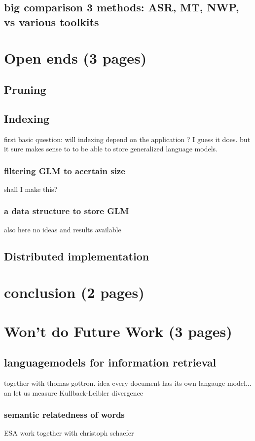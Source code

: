 \documentclass[•]{book}
\begin{document}
\section{big comparison 3 methods: ASR, MT, NWP, vs various toolkits}


\chapter{Open ends (3 pages)}
\section{Pruning}
\section{Indexing}

first basic question: will indexing depend on the application ? I guess it does. but it sure makes sense to to be able to store generalized language models.
\subsection{filtering GLM to acertain size}
shall I make this?
\subsection{a data structure to store GLM}
also here no ideas and results available

\section{Distributed implementation}
\chapter{conclusion (2 pages)}



\chapter{Won't do Future Work (3 pages)}
\section{languagemodels for information retrieval}
together with thomas gottron. idea every document has its own langauge model... an let us measure Kullback-Leibler divergence
\subsection{semantic relatedness of words}
ESA work together with christoph schaefer
\end{document}
